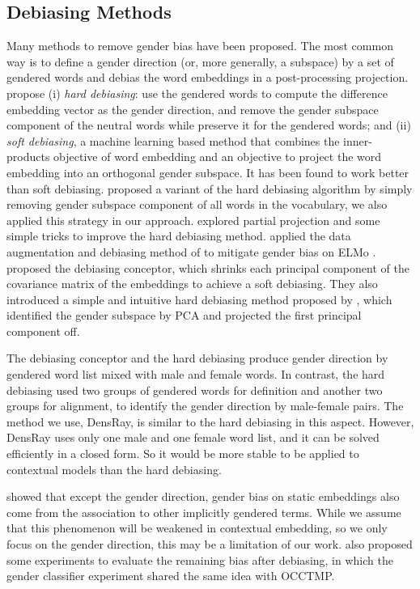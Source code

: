 \subsection{Debiasing Methods}
Many methods to remove gender bias have been proposed. The most common way is to define a gender direction (or, more generally, a subspace) by a set of gendered words and debias the word embeddings in a post-processing projection. \cite{bolukbasi2016man} propose (i) \emph{hard debiasing}: use the gendered words to compute the difference embedding vector as the gender direction, and remove the gender subspace component of the neutral words while preserve it for the gendered words; and (ii) \emph{soft debiasing}, a machine learning based method that combines the inner-products objective of word embedding and an objective to project the word embedding into an orthogonal gender subspace. It has been found to work better than soft debiasing. \cite{prost-etal-2019-debiasing} proposed a variant of the hard debiasing algorithm by simply removing gender subspace component of all words in the vocabulary, we also applied this strategy in our approach. \cite{dev2019attenuating} explored partial projection and some simple tricks to improve the hard debiasing method.
\cite{zhao2019gender} applied the data augmentation and debiasing method of  \cite{bolukbasi2016man} to mitigate gender bias on ELMo  \cite{Peters:2018}. \cite{karve2019conceptor} proposed the debiasing conceptor, which shrinks each principal component of the covariance matrix of the embeddings to achieve a soft debiasing. They also introduced a simple and intuitive hard debiasing method proposed by \cite{mu2018all}, which identified the gender subspace by PCA and projected the first principal component off.  

The debiasing conceptor and the \cite{mu2018all} hard debiasing produce gender direction by gendered word list mixed with male and female words. In contrast, the \cite{bolukbasi2016man} hard debiasing used two groups of gendered words for definition and another two groups for alignment, to identify the gender direction by male-female pairs. The method we use, DensRay, is similar to the \cite{bolukbasi2016man} hard debiasing in this aspect. However, DensRay uses only one male and one female word list, and it can be solved efficiently in a closed form. So it would be more stable to be applied to contextual models than the \cite{bolukbasi2016man} hard debiasing. 
 
\cite{gonen-goldberg-2019-lipstick-pig} showed that except the gender direction, gender bias on static embeddings also come from the association to other implicitly gendered terms. While we assume that this phenomenon will be weakened in contextual embedding, so we only focus on the gender direction, this may be a limitation of our work. \cite{gonen-goldberg-2019-lipstick-pig} also proposed some experiments to evaluate the remaining bias after debiasing, in which the gender classifier experiment shared the same idea with OCCTMP.



